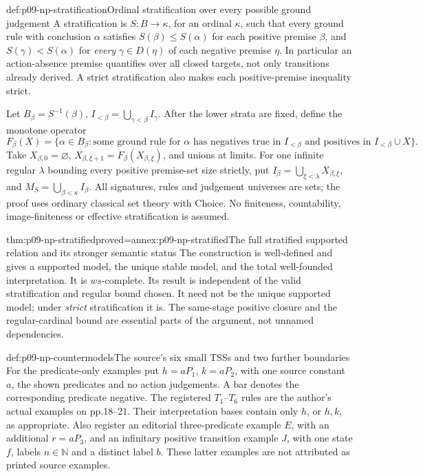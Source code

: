 \begin{hbdefinition}{def:p09-np-stratification}{Ordinal stratification over every possible ground judgement}
A stratification is \(S:B\to\kappa\), for an ordinal \(\kappa\),
such that every ground rule with conclusion \(\alpha\) satisfies
\(S(\beta)\leq S(\alpha)\) for each positive premise \(\beta\),
and \(S(\gamma)<S(\alpha)\) for \emph{every}
\(\gamma\in D(\eta)\) of each negative premise \(\eta\).
In particular an action-absence premise quantifies over all closed
targets, not only transitions already derived. A strict stratification
also makes each positive-premise inequality strict.

Let \(B_\beta=S^{-1}(\beta)\),
\(I_{<\beta}=\bigcup_{\gamma<\beta}I_\gamma\).
After the lower strata are fixed, define the monotone operator
\[
 F_\beta(X)=\{\alpha\in B_\beta:\text{some ground rule for }\alpha
 \text{ has negatives true in }I_{<\beta}
 \text{ and positives in }I_{<\beta}\cup X\}.
\]
Take \(X_{\beta,0}=\varnothing\),
\(X_{\beta,\xi+1}=F_\beta(X_{\beta,\xi})\), and unions at limits.
For one infinite regular \(\lambda\) bounding every positive
premise-set size strictly, put
\(I_\beta=\bigcup_{\xi<\lambda}X_{\beta,\xi}\),
and \(M_S=\bigcup_{\beta<\kappa}I_\beta\).
All signatures, rules and judgement universes are sets; the proof
uses ordinary classical set theory with Choice. No finiteness,
countability, image-finiteness or effective stratification is assumed.
\end{hbdefinition}

\begin{hbtheorem}{thm:p09-np-stratified}{proved=annex:p09-np-stratified}{The full stratified supported relation and its stronger semantic status}
The construction is well-defined and gives a supported model,
the unique stable model, and the total well-founded interpretation.
It is \(ws\)-complete. Its result is independent of the valid
stratification and regular bound chosen. It need not be the unique
supported model; under \emph{strict} stratification it is.
The same-stage positive closure and the regular-cardinal bound
are essential parts of the argument, not unnamed dependencies.
\end{hbtheorem}

\begin{hbdefinition}{def:p09-np-countermodels}{The source's six small TSSs and two further boundaries}
For the predicate-only examples put \(h=aP_1\), \(k=aP_2\),
with one source constant \(a\), the shown predicates and no
action judgements. A bar denotes the corresponding predicate negative.
The registered \(T_1\)--\(T_6\) rules are
the author's actual examples on pp.18--21. Their interpretation
bases contain only \(h\), or \(h,k\), as appropriate.
Also register an editorial three-predicate example \(E\), with
an additional \(r=aP_3\), and an infinitary positive transition
example \(J\), with one state \(f\), labels \(n\in\mathbb N\)
and a distinct label \(b\). These latter examples are not attributed
as printed source examples.
\end{hbdefinition}

